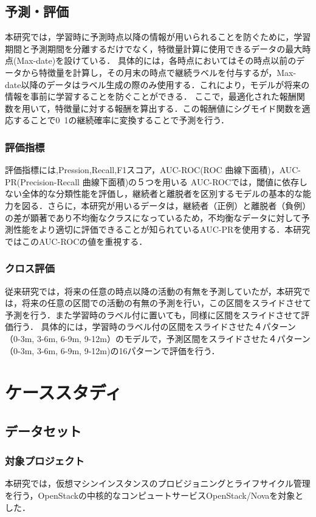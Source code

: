 \documentclass[submit,techrep,noauthor]{ipsj}
\begin{document}
\subsection{予測・評価}
本研究では，学習時に予測時点以降の情報が用いられることを防ぐために，学習期間と予測期間を分離するだけでなく，特徴量計算に使用できるデータの最大時点(Max-date)を設けている．
具体的には，各時点においてはその時点以前のデータから特徴量を計算し，その月末の時点で継続ラベルを付与するが，Max-date以降のデータはラベル生成の際のみ使用する．これにより，モデルが将来の情報を事前に学習することを防ぐことができる．
ここで，最適化された報酬関数を用いて，特徴量に対する報酬を算出する．この報酬値にシグモイド関数を適応することで0~1の継続確率に変換することで予測を行う．


\subsubsection{評価指標}
 評価指標には,Pression,Recall,F1スコア，AUC-ROC(ROC 曲線下面積)，AUC-PR(Precision-Recall 曲線下面積)の５つを用いる
 AUC-ROCでは，閾値に依存しない全体的な分類性能を評価し，継続者と離脱者を区別するモデルの基本的な能力を図る．さらに，本研究が用いるデータは，継続者（正例）と離脱者（負例）の差が顕著であり不均衡なクラスになっているため，不均衡なデータに対して予測性能をより適切に評価できることが知られているAUC-PRを使用する．本研究ではこのAUC-ROCの値を重視する．

\subsubsection{クロス評価}
従来研究では，将来の任意の時点以降の活動の有無を予測していたが，本研究では，将来の任意の区間での活動の有無の予測を行い，この区間をスライドさせて予測を行う．また学習時のラベル付に置いても，同様に区間をスライドさせて評価行う．
具体的には，学習時のラベル付の区間をスライドさせた４パターン（0-3m, 3-6m, 6-9m, 9-12m）のモデルで，予測区間をスライドさせた４パターン（0-3m, 3-6m, 6-9m, 9-12m)の16パターンで評価を行う．


\section{ケーススタディ}
\label{sec:casestudy}

\subsection{データセット}
\subsubsection{対象プロジェクト}
本研究では，仮想マシンインスタンスのプロビジョニングとライフサイクル管理を行う，OpenStackの中核的なコンピュートサービスOpenStack/Novaを対象とした．
\end{document}
